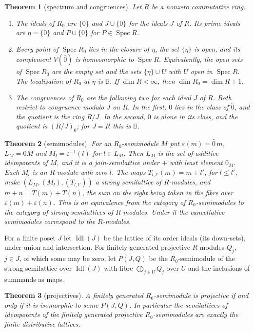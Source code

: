 \documentclass[11pt]{amsart}
\newtheorem{theorem}{Theorem}
\theoremstyle{remark}
\newcommand{\B}{\mathbb B}
\newcommand{\oz}{\widehat{0}}
\DeclareMathOperator{\Spec}{Spec}
\DeclareMathOperator{\Idl}{Idl}
\begin{document}
\begin{theorem}[spectrum and congruences]\label{thm:spec}
Let $R$ be a nonzero commutative ring.
\begin{enumerate}
\item[(a)] The ideals of $R_0$ are $\{0\}$ and $J\cup\{0\}$ for the ideals $J$ of $R$. Its prime ideals are $\eta=\{0\}$ and $P\cup\{0\}$ for $P\in\Spec R$.
\item[(b)] Every point of $\Spec R_0$ lies in the closure of $\eta$, the set $\{\eta\}$ is open, and its complement $V(\oz)$ is homeomorphic to $\Spec R$. Equivalently, the open sets of $\Spec R_0$ are the empty set and the sets $\{\eta\}\cup U$ with $U$ open in $\Spec R$. The localization of $R_0$ at $\eta$ is $\B$. If $\dim R<\infty$, then $\dim R_0=\dim R+1$.
\item[(c)] The congruences of $R_0$ are the following two for each ideal $J$ of $R$. Both restrict to congruence modulo $J$ on $R$. In the first, $0$ lies in the class of $\oz$, and the quotient is the ring $R/J$. In the second, $0$ is alone in its class, and the quotient is $(R/J)_0$; for $J=R$ this is $\B$.
\end{enumerate}
\end{theorem}

\begin{theorem}[semimodules]\label{thm:mod}
For an $R_0$-semimodule $M$ put $\varepsilon(m)=\oz\,m$, $L_M=\oz M$ and $M_l=\varepsilon^{-1}(l)$ for $l\in L_M$. Then $L_M$ is the set of additive idempotents of $M$, and it is a join-semilattice under $+$ with least element $0_M$. Each $M_l$ is an $R$-module with zero $l$. The maps $T_{l,l'}(m)=m+l'$, for $l\le l'$, make $(L_M,(M_l),(T_{l,l'}))$ a strong semilattice of $R$-modules, and $m+n=T(m)+T(n)$, the sum on the right being taken in the fibre over $\varepsilon(m)+\varepsilon(n)$. This is an equivalence from the category of $R_0$-semimodules to the category of strong semilattices of $R$-modules. Under it the cancellative semimodules correspond to the $R$-modules.
\end{theorem}

For a finite poset $J$ let $\Idl(J)$ be the lattice of its order ideals (its down-sets), under union and intersection. For finitely generated projective $R$-modules $Q_j$, $j\in J$, of which some may be zero, let $P(J,Q)$ be the $R_0$-semimodule of the strong semilattice over $\Idl(J)$ with fibre $\bigoplus_{j\in U}Q_j$ over $U$ and the inclusions of summands as maps.

\begin{theorem}[projectives]\label{thm:proj}
A finitely generated $R_0$-semimodule is projective if and only if it is isomorphic to some $P(J,Q)$. In particular the semilattices of idempotents of the finitely generated projective $R_0$-semimodules are exactly the finite distributive lattices.
\end{theorem}
\end{document}
